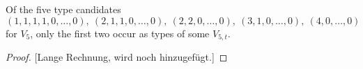 \begin{proposition}
Of the five type candidates
\[
(1,1,1,1,0,\dotsc,0),\ (2,1,1,0,\dotsc,0),\ (2,2,0,\dotsc,0),\ (3,1,0,\dotsc,0),\ (4,0,\dotsc,0)
\]
for $V_5$, only the first two occur as types of some $V_{5,t}$.
\end{proposition}

\begin{proof}
{}[Lange Rechnung, wird noch hinzugefügt.]
\end{proof}